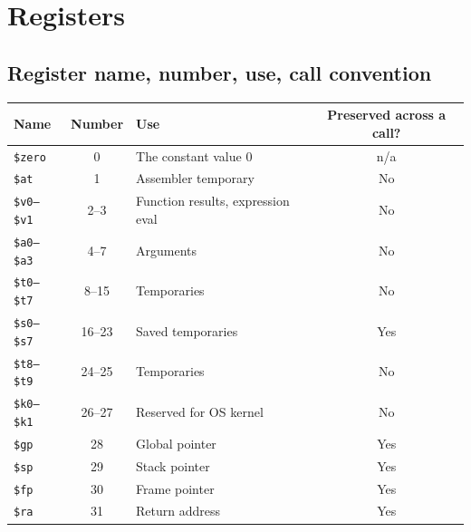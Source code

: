 \documentclass[10pt]{article}
\newcommand{\op}[1]{\texttt{#1}}
\begin{document}
\section{Registers}

\subsection{Register name, number, use, call convention}
\begin{center}
\begin{tabular}{@{}lcp{6.3cm}c@{}}
\toprule
Name & Number & Use & Preserved across a call? \\
\midrule
\op{\$zero}     & 0     & The constant value 0            & n/a \\
\op{\$at}       & 1     & Assembler temporary              & No \\
\op{\$v0--\$v1} & 2--3  & Function results, expression eval & No \\
\op{\$a0--\$a3} & 4--7  & Arguments                         & No \\
\op{\$t0--\$t7} & 8--15 & Temporaries                       & No \\
\op{\$s0--\$s7} & 16--23& Saved temporaries                 & Yes \\
\op{\$t8--\$t9} & 24--25& Temporaries                       & No \\
\op{\$k0--\$k1} & 26--27& Reserved for OS kernel             & No \\
\op{\$gp}       & 28    & Global pointer                    & Yes \\
\op{\$sp}       & 29    & Stack pointer                     & Yes \\
\op{\$fp}       & 30    & Frame pointer                     & Yes \\
\op{\$ra}       & 31    & Return address                    & Yes \\
\bottomrule
\end{tabular}
\end{center}
\end{document}
